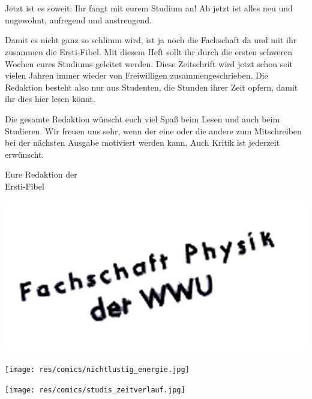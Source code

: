 
\section*{\Huge{}}
\begin{multicols*}{2}
Jetzt ist es soweit: Ihr fangt mit eurem Studium an! Ab jetzt ist alles neu und ungewohnt, aufregend und anstrengend.

Damit es nicht ganz so schlimm wird, ist ja noch die Fachschaft da und mit ihr zusammen die Ersti-Fibel. Mit diesem Heft sollt ihr durch die ersten schweren Wochen eures Studiums geleitet werden. Diese Zeitschrift wird jetzt schon seit vielen Jahren immer wieder von Freiwilligen zusammengeschrieben. Die Redaktion besteht also nur aus Studenten, die Stunden ihrer Zeit opfern, damit ihr dies hier lesen könnt.

Die gesamte Redaktion wünscht euch viel Spaß beim Lesen und auch beim Studieren. Wir freuen uns sehr, wenn der eine oder die andere zum Mitschreiben bei der nächsten Ausgabe motiviert werden kann. Auch Kritik ist jederzeit erwünscht.

Eure Redaktion der\\
Ersti-Fibel

\vspace{-0.75cm}
\hspace{2cm}
\includegraphics{res/fsphys_stempel.png}

\vspace{1.8cm}
\texttt{[image: res/comics/nichtlustig\_energie.jpg]}
\vspace{\fill}

\columnbreak

\texttt{[image: res/comics/studis\_zeitverlauf.jpg]}

\vspace{-0.5cm}

\end{multicols*}
